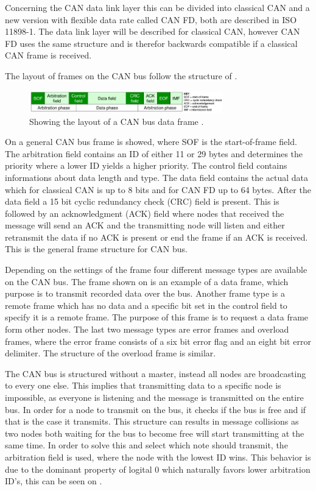 Concerning the CAN data link layer this can be divided into classical CAN and a new version with flexible data rate called CAN FD, both are described in ISO 11898-1. 
The data link layer will be described for classical CAN, however CAN FD uses the same structure and is therefor backwards compatible if a classical CAN frame is received.

The layout of frames on the CAN bus follow the structure of .

\begin{figure}[H]
\centering
\includegraphics[width=0.75\textwidth]{rapport/billeder/CAN_frame}
\caption{Showing the layout of a CAN bus data frame \cite{fig_CAN_frame}.}
\label{fig:CAN_frame}
\end{figure}

On  a general CAN bus frame is showed, where SOF is the start-of-frame field. The arbitration field contains an ID of either 11 or 29 bytes and determines the priority where a lower ID yields a higher priority. The control field contains informations about data length and type. The data field contains the actual data which for classical CAN is up to 8 bits and for CAN FD up to 64 bytes. After the data field a 15 bit cyclic redundancy check (CRC) field is present. This is followed by an acknowledgment (ACK) field where nodes that received the message will send an ACK and the transmitting node will listen and either retransmit the data if no ACK is present or end the frame if an ACK is received. This is the general frame structure for CAN bus.   


Depending on the settings of the frame four different message types are available on the CAN bus. 
The frame shown on  is an example of a data frame, which purpose is to transmit recorded data over the bus. Another frame type is a remote frame which has no data and a specific bit set in the control field to specify it is a remote frame. The purpose of this frame is to request a data frame form other nodes. The last two message types are error frames and overload frames, where the error frame consists of a six bit error flag and an eight bit error delimiter. The structure of the overload frame is similar.  

The CAN bus is structured without a master, instead all nodes are broadcasting to every one else. This implies that transmitting data to a specific node is impossible, as everyone is listening and the message is transmitted on the entire bus. In order for a node to transmit on the bus, it checks if the bus is free and if that is the case it transmits. This structure can results in message collisions as two nodes both waiting for the bus to become free will start transmitting at the same time. In order to solve this and select which note should transmit, the arbitration field is used, where the node with the lowest ID wins. This behavior is due to the dominant property of logital 0 which naturally favors lower arbitration ID's, this can be seen on .  


